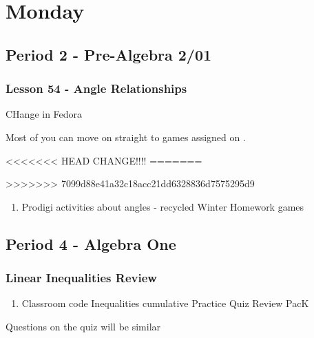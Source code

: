    \section[Mon]{Monday}
   \subsection[PA2/01]{Period 2 - Pre-Algebra 2/01}
   \begin{frame}[label=PA2_01]
   	\frametitle{Lesson 54 - Angle Relationships}

    CHange in Fedora

   \begin{alertblock}{}
   	Most of you can move on straight to  games assigned on \mangahightext. \\
   \end{alertblock}
<<<<<<< HEAD
      CHANGE!!!!
=======

>>>>>>> 7099d88e41a32c18acc21dd6328836d7575295d9
      \begin{enumerate}
        \item \mangahightext
        \rightarrowitem Prodigi activities about angles - recycled Winter Homework
        \rightarrowitem {} games
      \end{enumerate}
   	  \end{frame}

     \subsection[ALG]{Period 4 - Algebra One}
   	 \begin{frame}[label=ALG1]
   	 	\frametitle{Linear Inequalities Review}

      \begin{enumerate}
   	    \item {} Classroom code 
        \rightarrowitem Inequalities cumulative Practice
        \rightarrowitem Quiz Review PacK
      \end{enumerate}

      \begin{alertblock}{}
        Questions on the quiz will be similar
     \end{alertblock}
   	  \end{frame}

